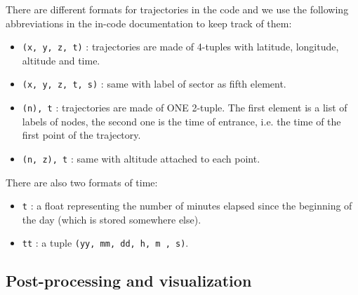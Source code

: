 \documentclass[12pt]{article}
\begin{document}
There are different formats for trajectories in the code and we use the following abbreviations in the in-code documentation to keep track of them:
\begin{itemize}
\item  \verb|(x, y, z, t)| : trajectories are made of 4-tuples with latitude, longitude, altitude and 
time.
\item \verb|(x, y, z, t, s)| : same with label of sector as fifth element.
\item \verb|(n), t| : trajectories are made of ONE 2-tuple. The first element is a list of labels
of nodes, the second one is the time of entrance, i.e. the time of the first point of the trajectory.
\item \verb|(n, z), t| : same with altitude attached to each point.
\end{itemize}
There are also two formats of time:
\begin{itemize}
\item \verb|t| : a float representing the number of minutes elapsed since the beginning of 
the day (which is stored somewhere else).
\item \verb|tt| : a tuple \verb|(yy, mm, dd, h, m , s)|.
\end{itemize}

\subsection{Post-processing and visualization}
\end{document}
